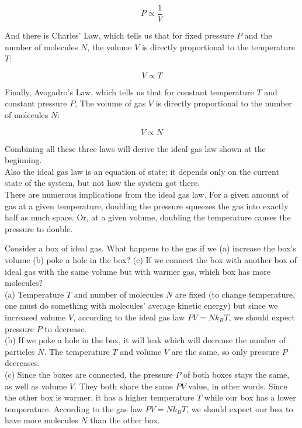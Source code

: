 \documentclass[12pt, a4paper]{article}
\newcounter{exa}
\begin{document}
$$P \propto \frac{1}{V}$$

And there is Charles' Law, which tells us that for fixed pressure $P$ and the number of molecules $N$, the volume $V$ is directly proportional to the temperature $T$:

$$V \propto T$$

Finally,  Avogadro's Law, which tells us that for constant temperature $T$ and constant pressure $P$, The volume of gas $V$ is directly proportional to the number of molecules $N$:

$$V \propto N$$

Combining all these three laws will derive the ideal gas law shown at the beginning. \\

Also the ideal gas law is an equation of state; it depends only on the current state of the system, but not how the system got there. \\

There are numerous implications from the ideal gas law. For a given amount of gas at a given temperature, doubling the pressure squeezes the gas into exactly half as much space. Or, at a given volume, doubling the temperature causes the pressure to double.

\begin{texample}
Consider a box of ideal gas. What happens to the gas if we (a) increase the box's volume (b) poke a hole in the box? (c) If we connect the box with another box of ideal gas with the same volume but with warmer gas, which box has more molecules? \\

(a) Temperature $T$ and number of molecules $N$ are fixed (to change temperature, one must do something with molecules' average kinetic energy) but since we increased volume $V$, according to the ideal gas law $PV=Nk_B T$, we should expect pressure $P$ to decrease. \\

(b) If we poke a hole in the box, it will leak which will decrease the number of particles $N$. The temperature $T$ and volume $V$ are the same, so only pressure $P$ decreases. \\

(c) Since the boxes are connected, the pressure $P$ of both boxes stays the same, as well as volume $V$. They both share the same $PV$ value, in other words. Since the other box is warmer, it has a higher temperature $T$ while our box has a lower temperature. According to the gas law $PV=Nk_B T$, we should expect our box to have more molecules $N$ than the other box.
\end{texample}
\end{document}
